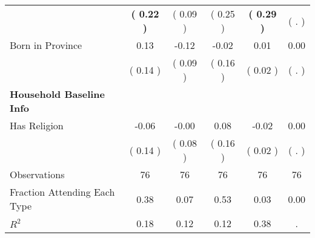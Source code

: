 \begin{table}[H]
{\begin{tabular}{lccccc}
\quad  & \textbf{(     0.22 )} & (     0.09 )  & (     0.25 )  & \textbf{(     0.29 )} & (        . ) \\
\quad Born in Province &      0.13 &     -0.12 &     -0.02 &      0.01 &      0.00 \\
\quad  & (     0.14 ) & (     0.09 )  & (     0.16 )  & (     0.02 ) & (        . ) \\
\midrule
\textbf{Household Baseline Info} \\
\quad Has Religion &     -0.06 &     -0.00 &      0.08 &     -0.02 &      0.00 \\
\quad  & (     0.14 ) & (     0.08 )  & (     0.16 )  & (     0.02 ) & (        . ) \\
\midrule
Observations & 76 & 76 & 76 & 76 & 76 \\
Fraction Attending Each Type &      0.38 &      0.07 &      0.53 &      0.03 &      0.00 \\
\midrule
$ R^2$ &      0.18 &      0.12 &      0.12 &      0.38 &         . \\
\bottomrule
\end{tabular}}
\end{table}
